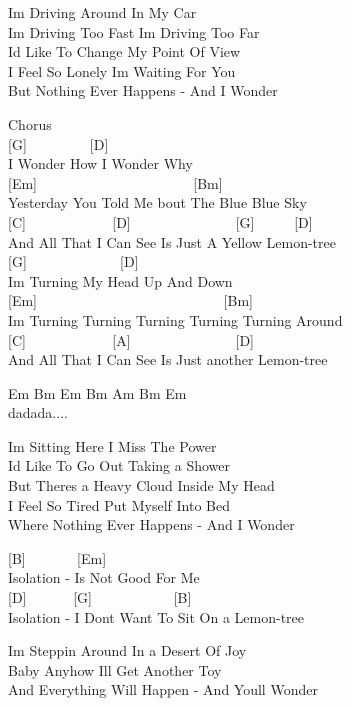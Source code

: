 \documentclass[
  letterpaper,
  twoside=false]{scrbook}
\begin{document}
I\textquotesingle m Driving Around In My Car\\
I\textquotesingle m Driving Too Fast I\textquotesingle m Driving Too
Far\\
I\textquotesingle d Like To Change My Point Of View\\
I Feel So Lonely I\textquotesingle m Waiting For You\\
But Nothing Ever Happens - And I Wonder

Chorus\\
{[}G{]} ~ ~ ~ ~ ~ {[}D{]}\\
I Wonder How I Wonder Why\\
{[}Em{]} ~ ~ ~ ~ ~ ~ ~ ~ ~ ~ ~ ~ ~ {[}Bm{]}\\
Yesterday You Told Me \textquotesingle bout The Blue Blue Sky\\
{[}C{]} ~ ~ ~ ~ ~ ~ ~ {[}D{]} ~ ~ ~ ~ ~ ~ ~ ~ ~{[}G{]} ~ ~ ~ {[}D{]}\\
And All That I Can See Is Just A Yellow Lemon-tree\\
{[}G{]} ~ ~ ~ ~ ~ ~ ~ ~{[}D{]}\\
I\textquotesingle m Turning My Head Up And Down\\
{[}Em{]} ~ ~ ~ ~ ~ ~ ~ ~ ~ ~ ~ ~ ~ ~ ~ ~{[}Bm{]}\\
I\textquotesingle m Turning Turning Turning Turning Turning Around\\
{[}C{]} ~ ~ ~ ~ ~ ~ ~ {[}A{]} ~ ~ ~ ~ ~ ~ ~ ~ ~{[}D{]}\\
And All That I Can See Is Just another Lemon-tree

Em Bm Em Bm Am Bm Em\\
dadada....

I\textquotesingle m Sitting Here I Miss The Power\\
I\textquotesingle d Like To Go Out Taking a Shower\\
But There\textquotesingle s a Heavy Cloud Inside My Head\\
I Feel So Tired Put Myself Into Bed\\
Where Nothing Ever Happens - And I Wonder

{[}B{]} ~ ~ ~ ~ {[}Em{]}\\
Isolation - Is Not Good For Me\\
{[}D{]} ~ ~ ~ ~{[}G{]} ~ ~ ~ ~ ~ ~ ~{[}B{]}\\
Isolation - I Don\textquotesingle t Want To Sit On a Lemon-tree

I\textquotesingle m Steppin\textquotesingle{} Around In a Desert Of
Joy\\
Baby Anyhow I\textquotesingle ll Get Another Toy\\
And Everything Will Happen - And You\textquotesingle ll Wonder
\end{document}
